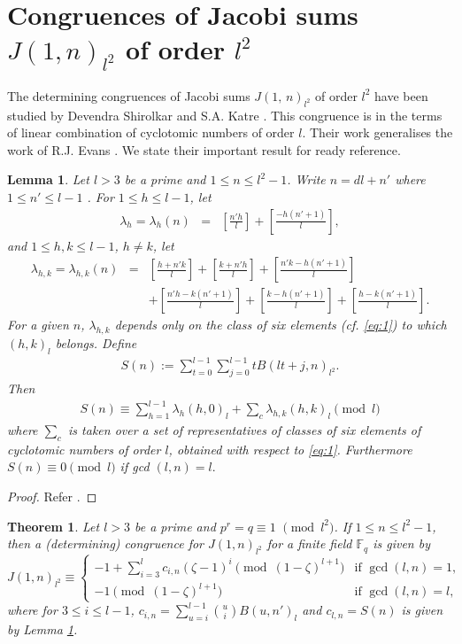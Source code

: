 \documentclass[a4paper,12pt]{article}
\newtheorem{theorem}{Theorem}[section]
\newtheorem{lemma}{Lemma}[section]
\newcommand{\disp}{\displaystyle}
\def\F{{\mathbb F}}
\def\vpmod{\!\!\!\pmod}
\begin{document}
\section{Congruences of Jacobi sums $J(1,n)_{l^2}$ of order $l^{2}$}
\noindent The determining congruences of Jacobi sums $J(1,\,n)_{l^2}$ of order $l^{2}$ have been studied by Devendra Shirolkar and S.A. Katre \cite{15}. This congruence is in the terms of linear combination of cyclotomic numbers of order $l$. Their work generalises the work of R.J. Evans \cite{5}. We state their important result for ready reference.
\begin{lemma}\label{lem:lemma1}
Let $l>3$ be a prime and  $1\leq n \leq l^2 -1$. Write $n =dl +n'$ where $1\leq n' \leq l-1$  . For $1\leq h \leq l-1$, let\begin{eqnarray*}
\lambda_{h} = \lambda_{h}(n) &=& \left[\frac{n'h}{l}\right] + \left[\frac{-h(n' + 1)}{l}\right], \end{eqnarray*} and $1\leq h,k \leq l-1 $, $h \neq k$, let \begin{eqnarray*}\lambda_{h,k} = \lambda_{h,k}(n)&=& \left[\frac{h + n'k}{l}\right] + \left[\frac{k + n'h}{l}\right] + \left[\frac{n'k -h(n'+1)}{l}\right]\\ &&+ \left[\frac{n'h - k(n'+ 1)}{l}\right] + \left[\frac{k - h(n' + 1)}{l}\right] + \left[\frac{h -k(n'+1)}{l}\right].
\end{eqnarray*} For a given $n$, $\lambda_{h,k}$ depends only on the class of six elements (cf. \eqref{eq:1}) to which $(h,k)_l$ belongs. Define \begin{eqnarray*}S(n):= \sum_{t = 0}^{l-1}\sum_{j= 0}^{l-1}tB(lt + j, n)_{l^2}.\end{eqnarray*} Then 
\begin{eqnarray*}
S(n) \equiv 
\disp{\sum_{h = 1}^{l-1}}\lambda_{h} (h,0)_{l} + \disp{\sum_{c}}\lambda_{h,k}(h,k)_{l} \pmod l
\end{eqnarray*} 
where $\disp{\sum_{c}}$ is taken over a set of representatives of classes of six elements of cyclotomic numbers 
of order $l$, obtained with respect to \eqref{eq:1}. Furthermore $S(n)\equiv 0 \pmod l$ if gcd $(l,n) = l.$
\end{lemma}
\begin{proof}
Refer \cite{15}.
\end{proof}
\begin{theorem}\label{thm:theorem2}
Let $l > 3$ be a prime and $p^r = q \equiv 1\,\, \vpmod{l^2}$. If $ 1 \leq n \leq l^2 -1$, then a (determining) congruence for $J(1,n)_{l^2}$ for a finite field $\F_{q}$ is given by
\begin{equation*}
J(1,n)_{l^2} \equiv 
\begin{cases}
-1 + \displaystyle{\sum_{i=3}^{l}c_{i,n}(\zeta -1)^i} \vpmod{(1-\zeta)^{l + 1}} & \text{if $\gcd (l,n) =1$,}\\
-1  \vpmod{(1-\zeta)^{l + 1}} &\text{if $\gcd (l,n) = l$,}
\end{cases}
\end{equation*}
where for $3 \leq i \leq l-1$, $\displaystyle{c_{i,n}= \sum_{u=i}^{l-1}{u\choose i}B(u,n')_{l}}$ and $c_{l,n} = S(n)$ is given by Lemma \ref{lem:lemma1}.
\end{theorem}
\end{document}
